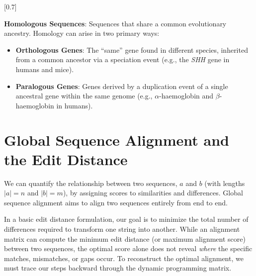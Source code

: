 [0.7]

\begin{important}
  \textbf{Homologous Sequences}: Sequences that share a common evolutionary ancestry. Homology can arise in two primary ways:
  \begin{itemize}
      \item \textbf{Orthologous Genes}: The ``same'' gene found in different species, inherited from a common ancestor via a speciation event (e.g., the \textit{SHH} gene in humans and mice).
      \item \textbf{Paralogous Genes}: Genes derived by a duplication event of a single ancestral gene within the same genome (e.g., $\alpha$-haemoglobin and $\beta$-haemoglobin in humans).
  \end{itemize}
\end{important}

\section{Global Sequence Alignment and the Edit Distance}
We can quantify the relationship between two sequences, $a$ and $b$ (with lengths $|a| = n$ and $|b| = m$), by assigning scores to similarities and differences. Global sequence alignment aims to align two sequences entirely from end to end. 

In a basic edit distance formulation, our goal is to minimize the total number of differences required to transform one string into another. While an alignment matrix can compute the minimum edit distance (or maximum alignment score) between two sequences, the optimal score alone does not reveal \textit{where} the specific matches, mismatches, or gaps occur. To reconstruct the optimal alignment, we must trace our steps backward through the dynamic programming matrix.

